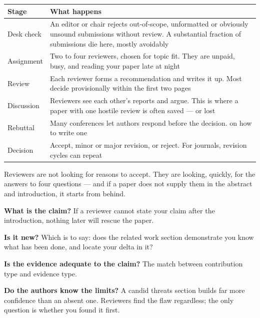 \begin{center}
\small
\begin{tabular}{@{}L{2.8cm}L{11.6cm}@{}}
\toprule
\textbf{Stage} & \textbf{What happens} \\
\midrule
Desk check     & An editor or chair rejects out-of-scope, unformatted or
                 obviously unsound submissions without review. A substantial
                 fraction of submissions die here, mostly avoidably \\
Assignment     & Two to four reviewers, chosen for topic fit. They are unpaid,
                 busy, and reading your paper late at night \\
Review         & Each reviewer forms a recommendation and writes it up.
                 Most decide provisionally within the first two pages \\
Discussion     & Reviewers see each other's reports and argue. This is where
                 a paper with one hostile review is often saved --- or lost \\
Rebuttal       & Many conferences let authors respond before the decision.
                  on how to write one \\
Decision       & Accept, minor or major revision, or reject. For journals,
                 revision cycles can repeat \\
\bottomrule
\end{tabular}
\end{center}

\begin{conceptbox}
Reviewers are not looking for reasons to accept. They are looking, quickly, for
the answers to four questions --- and if a paper does not supply them in the
abstract and introduction, it starts from behind.

\begin{tightnum}
  \item \textbf{What is the claim?} If a reviewer cannot state your claim after
    the introduction, nothing later will rescue the paper.
  \item \textbf{Is it new?} Which is to say: does the related work section
    demonstrate you know what has been done, and locate your delta in it?
  \item \textbf{Is the evidence adequate to the claim?} The
     match between contribution type and evidence type.
  \item \textbf{Do the authors know the limits?} A candid threats section
    builds far more confidence than an absent one. Reviewers find the flaw
    regardless; the only question is whether you found it first.
\end{tightnum}
\end{conceptbox}

